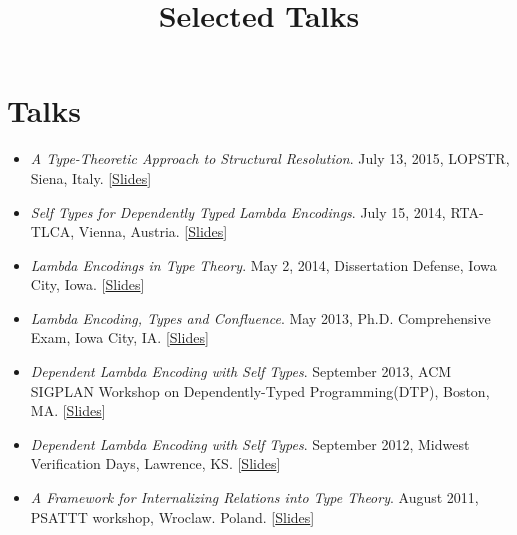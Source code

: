 \documentclass[10pt]{article}
\title{\bfseries\Large Selected Talks}
\date{}
\begin{document}
\maketitle
\vspace{-4em}

\vspace{20pt}
\section*{Talks}
\begin{itemize}
\item \textit{A Type-Theoretic Approach to Structural Resolution}. July 13, 2015, LOPSTR, Siena, Italy. [\href{../../document/talks/lopstr-2015.pdf}{Slides}]

\item \textit{Self Types for Dependently Typed Lambda Encodings}. July 15, 2014, RTA-TLCA, Vienna, Austria. [\href{../../document/talks/rta-tlca-14.pdf}{Slides}]
\item \textit{Lambda Encodings in Type Theory}. May 2, 2014, Dissertation Defense, Iowa City, Iowa. [\href{../../document/talks/thesis-talk.pdf}{Slides}]
\item \textit{Lambda Encoding, Types and Confluence}. May 2013, Ph.D. Comprehensive Exam, Iowa City, IA. [\href{../../document/talks/comp.pdf}{Slides}]
\item \textit{Dependent Lambda Encoding with Self Types}. September 2013, ACM SIGPLAN Workshop on Dependently-Typed Programming(DTP), Boston, MA. [\href{../../document/talks/dtp-2013.pdf}{Slides}]
\item \textit{Dependent Lambda Encoding with Self Types}. September 2012, Midwest Verification Days, Lawrence, KS. [\href{../../document/talks/mvd-2012.pdf}{Slides}]

\item \textit{A Framework for Internalizing Relations into Type Theory}. August 2011, PSATTT workshop, Wroclaw. Poland. [\href{../../document/talks/psattt11-talk.pdf}{Slides}]
\end{itemize}
\end{document}
